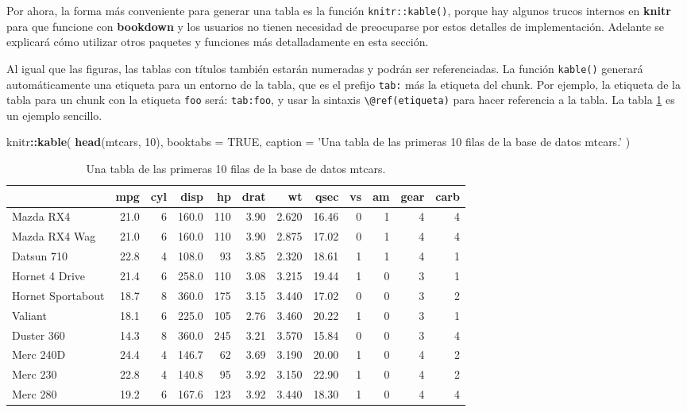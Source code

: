 \documentclass[12pt,]{krantz}
\makeatletter
\newenvironment{Shaded}{\begin{snugshade}}{\end{snugshade}}
\newcommand{\KeywordTok}[1]{\textcolor[rgb]{0.13,0.29,0.53}{\textbf{#1}}}
\newcommand{\DataTypeTok}[1]{\textcolor[rgb]{0.13,0.29,0.53}{#1}}
\newcommand{\DecValTok}[1]{\textcolor[rgb]{0.00,0.00,0.81}{#1}}
\newcommand{\StringTok}[1]{\textcolor[rgb]{0.31,0.60,0.02}{#1}}
\newcommand{\OtherTok}[1]{\textcolor[rgb]{0.56,0.35,0.01}{#1}}
\newcommand{\OperatorTok}[1]{\textcolor[rgb]{0.81,0.36,0.00}{\textbf{#1}}}
\newcommand{\NormalTok}[1]{#1}
\newenvironment{kframe}{%
\medskip{}
\setlength{\fboxsep}{.8em}
 \def\at@end@of@kframe{}%
 \ifinner\ifhmode%
  \def\at@end@of@kframe{\end{minipage}}%
  \begin{minipage}{\columnwidth}%
 \fi\fi%
 \def\FrameCommand##1{\hskip\@totalleftmargin \hskip-\fboxsep
 \colorbox{shadecolor}{##1}\hskip-\fboxsep
     \hskip-\linewidth \hskip-\@totalleftmargin \hskip\columnwidth}%
 \MakeFramed {\advance\hsize-\width
   \@totalleftmargin\z@ \linewidth\hsize
   \@setminipage}}%
 {\par\unskip\endMakeFramed%
 \at@end@of@kframe}
\renewenvironment{Shaded}{\begin{kframe}}{\end{kframe}}
\theoremstyle{definition}
\theoremstyle{definition}
\theoremstyle{definition}
\theoremstyle{remark}
\makeatother
\begin{document}
Por ahora, la forma más conveniente para generar una tabla es la función
\texttt{knitr::kable()}, porque hay algunos trucos internos en
\textbf{knitr} para que funcione con \textbf{bookdown} y los usuarios no
tienen necesidad de preocuparse por estos detalles de implementación.
Adelante se explicará cómo utilizar otros paquetes y funciones más
detalladamente en esta sección.

Al igual que las figuras, las tablas con títulos también estarán
numeradas y podrán ser referenciadas. La función \texttt{kable()}
generará automáticamente una etiqueta para un entorno de la tabla, que
es el prefijo \texttt{tab:} más la etiqueta del chunk. Por ejemplo, la
etiqueta de la tabla para un chunk con la etiqueta \texttt{foo} será:
\texttt{tab:foo}, y usar la sintaxis
\texttt{\textbackslash{}@ref(etiqueta)} para hacer referencia a la
tabla. La tabla \ref{tab:table-single} es un ejemplo sencillo.

\begin{Shaded}
\begin{Highlighting}[]
\NormalTok{knitr}\OperatorTok{::}\KeywordTok{kable}\NormalTok{(}
  \KeywordTok{head}\NormalTok{(mtcars, }\DecValTok{10}\NormalTok{), }\DataTypeTok{booktabs =} \OtherTok{TRUE}\NormalTok{,}
  \DataTypeTok{caption =} \StringTok{'Una tabla de las primeras 10 filas de la base de datos mtcars.'}
\NormalTok{)}
\end{Highlighting}
\end{Shaded}

\begin{table}

\caption{\label{tab:table-single}Una tabla de las primeras 10 filas de la base de datos mtcars.}
\centering
\begin{tabular}[t]{lrrrrrrrrrrr}
\toprule
  & mpg & cyl & disp & hp & drat & wt & qsec & vs & am & gear & carb\\
\midrule
Mazda RX4 & 21.0 & 6 & 160.0 & 110 & 3.90 & 2.620 & 16.46 & 0 & 1 & 4 & 4\\
Mazda RX4 Wag & 21.0 & 6 & 160.0 & 110 & 3.90 & 2.875 & 17.02 & 0 & 1 & 4 & 4\\
Datsun 710 & 22.8 & 4 & 108.0 & 93 & 3.85 & 2.320 & 18.61 & 1 & 1 & 4 & 1\\
Hornet 4 Drive & 21.4 & 6 & 258.0 & 110 & 3.08 & 3.215 & 19.44 & 1 & 0 & 3 & 1\\
Hornet Sportabout & 18.7 & 8 & 360.0 & 175 & 3.15 & 3.440 & 17.02 & 0 & 0 & 3 & 2\\
\addlinespace
Valiant & 18.1 & 6 & 225.0 & 105 & 2.76 & 3.460 & 20.22 & 1 & 0 & 3 & 1\\
Duster 360 & 14.3 & 8 & 360.0 & 245 & 3.21 & 3.570 & 15.84 & 0 & 0 & 3 & 4\\
Merc 240D & 24.4 & 4 & 146.7 & 62 & 3.69 & 3.190 & 20.00 & 1 & 0 & 4 & 2\\
Merc 230 & 22.8 & 4 & 140.8 & 95 & 3.92 & 3.150 & 22.90 & 1 & 0 & 4 & 2\\
Merc 280 & 19.2 & 6 & 167.6 & 123 & 3.92 & 3.440 & 18.30 & 1 & 0 & 4 & 4\\
\bottomrule
\end{tabular}
\end{table}
\end{document}
